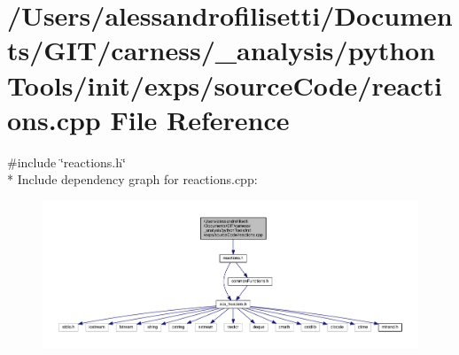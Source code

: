 \hypertarget{a00074}{\section{/\+Users/alessandrofilisetti/\+Documents/\+G\+I\+T/carness/\+\_\+analysis/python\+Tools/init/exps/source\+Code/reactions.cpp File Reference}
\label{a00074}
}
{\ttfamily \#include \char`\"{}reactions.\+h\char`\"{}}\\*
Include dependency graph for reactions.\+cpp\+:\nopagebreak
\begin{figure}[H]
\begin{center}
\leavevmode
\includegraphics[width=350pt]{a00196}
\end{center}
\end{figure}
